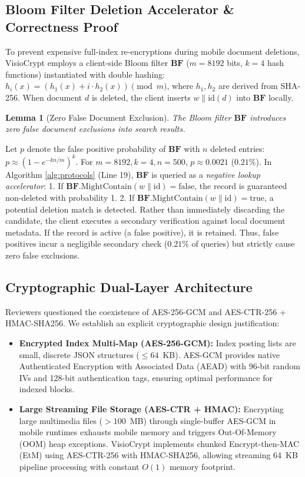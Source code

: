 \documentclass[10pt,conference]{IEEEtran}
\newtheorem{lemma}{Lemma}
\begin{document}
\subsection{Bloom Filter Deletion Accelerator \& Correctness Proof}
To prevent expensive full-index re-encryptions during mobile document deletions, VisioCrypt employs a client-side Bloom filter $\mathbf{BF}$ ($m = 8192$ bits, $k = 4$ hash functions) instantiated with double hashing: $h_i(x) = (h_1(x) + i \cdot h_2(x)) \pmod m$, where $h_1, h_2$ are derived from SHA-256. When document $d$ is deleted, the client inserts $w \parallel \text{id}(d)$ into $\mathbf{BF}$ locally.

\begin{lemma}[Zero False Document Exclusion]
The Bloom filter $\mathbf{BF}$ introduces zero false document exclusions into search results.
\end{lemma}
\begin{IEEEproof}
Let $p$ denote the false positive probability of $\mathbf{BF}$ with $n$ deleted entries: $p \approx (1 - e^{-k n / m})^k$. For $m = 8192, k = 4, n = 500$, $p \approx 0.0021$ ($0.21\%$). In Algorithm \ref{alg:protocols} (Line 19), $\mathbf{BF}$ is queried as a \emph{negative lookup accelerator}:
1. If $\mathbf{BF}.\text{MightContain}(w \parallel \text{id}) = \text{false}$, the record is guaranteed non-deleted with probability 1.
2. If $\mathbf{BF}.\text{MightContain}(w \parallel \text{id}) = \text{true}$, a potential deletion match is detected. Rather than immediately discarding the candidate, the client executes a secondary verification against local document metadata. If the record is active (a false positive), it is retained. Thus, false positives incur a negligible secondary check ($0.21\%$ of queries) but strictly cause zero false exclusions.
\end{IEEEproof}

\subsection{Cryptographic Dual-Layer Architecture}
Reviewers questioned the coexistence of AES-256-GCM and AES-CTR-256 + HMAC-SHA256. We establish an explicit cryptographic design justification:
\begin{itemize}
    \item \textbf{Encrypted Index Multi-Map (AES-256-GCM):} Index posting lists are small, discrete JSON structures ($\le 64$~KB). AES-GCM provides native Authenticated Encryption with Associated Data (AEAD) with 96-bit random IVs and 128-bit authentication tags, ensuring optimal performance for indexed blocks.
    \item \textbf{Large Streaming File Storage (AES-CTR + HMAC):} Encrypting large multimedia files ($> 100$~MB) through single-buffer AES-GCM in mobile runtimes exhausts mobile memory and triggers Out-Of-Memory (OOM) heap exceptions. VisioCrypt implements chunked Encrypt-then-MAC (EtM) using AES-CTR-256 with HMAC-SHA256, allowing streaming 64~KB pipeline processing with constant $O(1)$ memory footprint.
\end{itemize}
\end{document}

